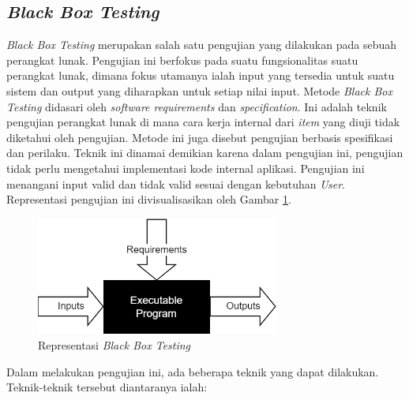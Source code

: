 \subsection{\textit{Black Box Testing}}
\textit{Black Box Testing} merupakan salah satu pengujian yang dilakukan pada sebuah perangkat lunak.
Pengujian ini berfokus pada suatu fungsionalitas suatu perangkat lunak, dimana fokus utamanya ialah input yang tersedia untuk suatu sistem dan output yang diharapkan untuk setiap nilai input.
Metode \textit{Black Box Testing} didasari oleh \textit{software requirements} dan \textit{specification}. Ini adalah teknik pengujian perangkat lunak di mana cara kerja internal dari \textit{item} yang diuji tidak diketahui oleh pengujian.
Metode ini juga disebut pengujian berbasis spesifikasi dan perilaku. 
Teknik ini dinamai demikian karena dalam pengujian ini, pengujian tidak perlu mengetahui implementasi kode internal aplikasi\cite{beizer1995black}.
Pengujian ini menangani input valid dan tidak valid sesuai dengan kebutuhan \textit{User}. Representasi pengujian ini divisualisasikan oleh Gambar \ref*{Fig:Black Box Testing}.
\begin{figure}[H]
	\centering
	\includegraphics[width=8cm]{contents/chapter-2/images/BlackBox-Testing.png}
	\caption{Representasi \textit{Black Box Testing}\cite{beizer1995black}}
	\label{Fig:Black Box Testing}
\end{figure}
Dalam melakukan pengujian ini, ada beberapa teknik yang dapat dilakukan. Teknik-teknik tersebut diantaranya ialah:
